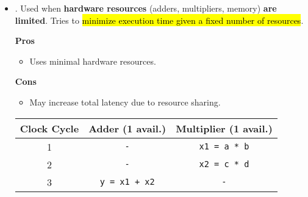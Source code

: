 \begin{itemize}
    \item {}. Used when \textbf{hardware resources} (adders, multipliers, memory) \textbf{are limited}. Tries to \hl{minimize execution time given a fixed number of resources}.
    \begin{flushleft}
        \textcolor{Green3}{ \textbf{Pros}}
    \end{flushleft}
    \begin{itemize}[label=\textcolor{Green3}{}]
        \item Uses minimal hardware resources.
    \end{itemize}
    \begin{flushleft}
        \textcolor{Red2}{ \textbf{Cons}}
    \end{flushleft}
    \begin{itemize}[label=\textcolor{Red2}{}]
        \item May increase total latency due to resource sharing.
    \end{itemize}
    \begin{examplebox}
        \begin{center}
            \begin{tabular}{@{} c c c @{}}
                \toprule
                \textbf{Clock Cycle} & \textbf{Adder (1 avail.)} & \textbf{Multiplier (1 avail.)} \\
                \midrule
                1 & \texttt{-} & \texttt{x1 = a * b} \\ [.5em]
                2 & \texttt{-} & \texttt{x2 = c * d} \\ [.5em]
                3 & \texttt{y = x1 + x2} & \texttt{-} \\
                \bottomrule
            \end{tabular}
        \end{center}
    \end{examplebox}
\end{itemize}

\newpage

